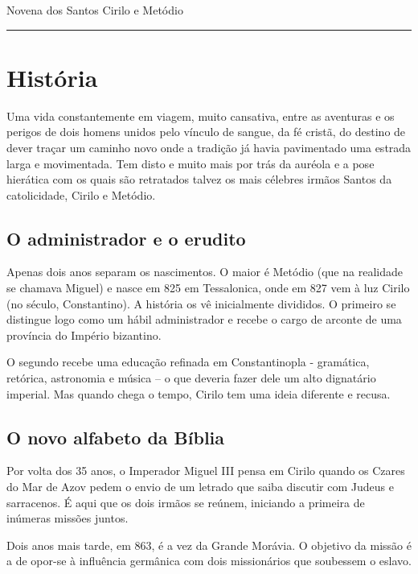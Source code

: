 \documentclass[a4paper,14pt]{extarticle} \usepackage[utf8]{inputenc}
\begin{document}



\begin{center}
  {\huge Novena dos Santos Cirilo e Metódio}
\end{center}



\noindent\rule{\textwidth}{0.4pt}
\tableofcontents
\thispagestyle{empty}


\newpage

\section{História}
Uma vida constantemente em viagem, muito cansativa, entre as aventuras e os perigos de dois homens unidos pelo vínculo de sangue, da fé cristã, do destino de dever traçar um caminho novo onde a tradição já havia pavimentado uma estrada larga e movimentada. Tem disto e muito mais por trás da auréola e a pose hierática com os quais são retratados talvez os mais célebres irmãos Santos da catolicidade, Cirilo e Metódio.
\subsection{O administrador e o erudito}

Apenas dois anos separam os nascimentos. O maior é Metódio (que na realidade se chamava Miguel) e nasce em 825 em Tessalonica, onde em 827 vem à luz Cirilo (no século, Constantino). A história os vê inicialmente divididos. O primeiro se distingue logo como um hábil administrador e recebe o cargo de arconte de uma província do Império bizantino.

O segundo recebe uma educação refinada em Constantinopla - gramática, retórica, astronomia e música – o que deveria fazer dele um alto dignatário imperial. Mas quando chega o tempo, Cirilo tem uma ideia diferente e recusa.

\subsection{O novo alfabeto da Bíblia}

Por volta dos 35 anos, o Imperador Miguel III pensa em Cirilo quando os Czares do Mar de Azov pedem o envio de um letrado que saiba discutir com Judeus e sarracenos. É aqui que os dois irmãos se reúnem, iniciando a primeira de inúmeras missões juntos.

Dois anos mais tarde, em 863, é a vez da Grande Morávia. O objetivo da missão é a de opor-se à influência germânica com dois missionários que soubessem o eslavo.
\end{document}

